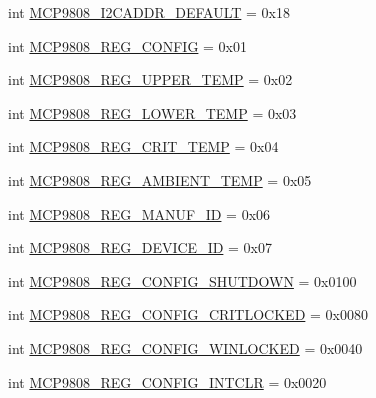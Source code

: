 \begin{DoxyCompactItemize}
\item 
int \hyperlink{namespaceAdafruit__MCP9808_1_1MCP9808_a6f8ad8887f9b71037409b4067c218e8e}{M\+C\+P9808\+\_\+\+I2\+C\+A\+D\+D\+R\+\_\+\+D\+E\+F\+A\+U\+LT} = 0x18
\item 
int \hyperlink{namespaceAdafruit__MCP9808_1_1MCP9808_a2f6638375cfd343e323f35420a00491d}{M\+C\+P9808\+\_\+\+R\+E\+G\+\_\+\+C\+O\+N\+F\+IG} = 0x01
\item 
int \hyperlink{namespaceAdafruit__MCP9808_1_1MCP9808_a90ebd3c6c61c574b6368b93eb6e5f593}{M\+C\+P9808\+\_\+\+R\+E\+G\+\_\+\+U\+P\+P\+E\+R\+\_\+\+T\+E\+MP} = 0x02
\item 
int \hyperlink{namespaceAdafruit__MCP9808_1_1MCP9808_abaf62b34a1c08075f9b7dc95c58eecf6}{M\+C\+P9808\+\_\+\+R\+E\+G\+\_\+\+L\+O\+W\+E\+R\+\_\+\+T\+E\+MP} = 0x03
\item 
int \hyperlink{namespaceAdafruit__MCP9808_1_1MCP9808_a9ae3aa795844d1e07a08acb4e4db094f}{M\+C\+P9808\+\_\+\+R\+E\+G\+\_\+\+C\+R\+I\+T\+\_\+\+T\+E\+MP} = 0x04
\item 
int \hyperlink{namespaceAdafruit__MCP9808_1_1MCP9808_a83505ee1f47f917423e34d57f227b008}{M\+C\+P9808\+\_\+\+R\+E\+G\+\_\+\+A\+M\+B\+I\+E\+N\+T\+\_\+\+T\+E\+MP} = 0x05
\item 
int \hyperlink{namespaceAdafruit__MCP9808_1_1MCP9808_aef2c588b25ef78948f5b2b130af69e17}{M\+C\+P9808\+\_\+\+R\+E\+G\+\_\+\+M\+A\+N\+U\+F\+\_\+\+ID} = 0x06
\item 
int \hyperlink{namespaceAdafruit__MCP9808_1_1MCP9808_a39c3de3ceba46e0077bd5136f9822f81}{M\+C\+P9808\+\_\+\+R\+E\+G\+\_\+\+D\+E\+V\+I\+C\+E\+\_\+\+ID} = 0x07
\item 
int \hyperlink{namespaceAdafruit__MCP9808_1_1MCP9808_aad7fcfad6fa5a7fbe81eae7d615ebbef}{M\+C\+P9808\+\_\+\+R\+E\+G\+\_\+\+C\+O\+N\+F\+I\+G\+\_\+\+S\+H\+U\+T\+D\+O\+WN} = 0x0100
\item 
int \hyperlink{namespaceAdafruit__MCP9808_1_1MCP9808_ae93ba64afebbb67c15ba2ee1185c07a3}{M\+C\+P9808\+\_\+\+R\+E\+G\+\_\+\+C\+O\+N\+F\+I\+G\+\_\+\+C\+R\+I\+T\+L\+O\+C\+K\+ED} = 0x0080
\item 
int \hyperlink{namespaceAdafruit__MCP9808_1_1MCP9808_a55af88d7ac0cc9e58f3f6b996a23d4e2}{M\+C\+P9808\+\_\+\+R\+E\+G\+\_\+\+C\+O\+N\+F\+I\+G\+\_\+\+W\+I\+N\+L\+O\+C\+K\+ED} = 0x0040
\item 
int \hyperlink{namespaceAdafruit__MCP9808_1_1MCP9808_ae420f56dd648c9cd91129ed8ef4d31c3}{M\+C\+P9808\+\_\+\+R\+E\+G\+\_\+\+C\+O\+N\+F\+I\+G\+\_\+\+I\+N\+T\+C\+LR} = 0x0020
\item 

\end{DoxyCompactItemize}
